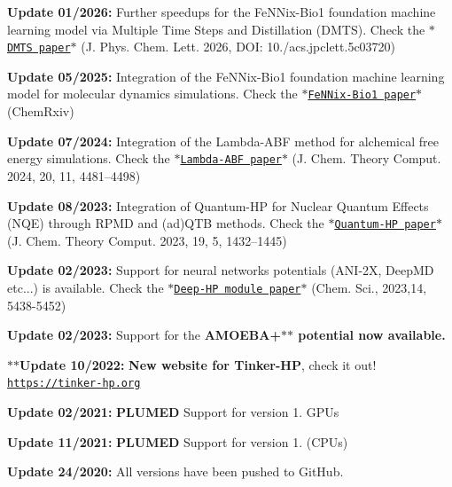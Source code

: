 
\begin{DoxyItemize}
\item {\bfseries Update 01/2026\-:} Further speedups for the Fe\-N\-Nix-\/\-Bio1 foundation machine learning model via Multiple Time Steps and Distillation (D\-M\-T\-S). Check the \href{https://pubs.acs.org/doi/full/10.1021/acs.jpclett.5c03720}{\tt $\ast$\-D\-M\-T\-S paper$\ast$} (J. Phys. Chem. Lett. 2026, D\-O\-I\-: 10./acs.jpclett.\-5c03720)
\item {\bfseries Update 05/2025\-:} Integration of the Fe\-N\-Nix-\/\-Bio1 foundation machine learning model for molecular dynamics simulations. Check the \href{https://doi.org/10.26434/chemrxiv-2025-f1hgn-v4}{\tt $\ast$\-Fe\-N\-Nix-\/\-Bio1 paper$\ast$} (Chem\-Rxiv)
\item {\bfseries Update 07/2024\-:} Integration of the Lambda-\/\-A\-B\-F method for alchemical free energy simulations. Check the \href{https://doi.org/10.1021/acs.jctc.3c01249}{\tt $\ast$\-Lambda-\/\-A\-B\-F paper$\ast$} (J. Chem. Theory Comput. 2024, 20, 11, 4481–4498)
\item {\bfseries Update 08/2023\-:} Integration of Quantum-\/\-H\-P for Nuclear Quantum Effects (N\-Q\-E) through R\-P\-M\-D and (ad)Q\-T\-B methods. Check the \href{https://doi.org/10.1021/acs.jctc.2c01233}{\tt $\ast$\-Quantum-\/\-H\-P paper$\ast$} (J. Chem. Theory Comput. 2023, 19, 5, 1432–1445)
\item {\bfseries Update 02/2023\-:} Support for neural networks potentials (A\-N\-I-\/2\-X, Deep\-M\-D etc...) is available. Check the \href{https://doi.org/10.1039/D2SC04815A}{\tt $\ast$\-Deep-\/\-H\-P module paper$\ast$} (Chem. Sci., 2023,14, 5438-\/5452)
\item {\bfseries Update 02/2023\-:} Support for the {\bfseries A\-M\-O\-E\-B\-A+$\ast$$\ast$ potential now available.}
\item {\bfseries $\ast$$\ast$\-Update 10/2022\-:} {\bfseries New website for Tinker-\/\-H\-P}, check it out! \href{https://tinker-hp.org}{\tt https\-://tinker-\/hp.\-org}
\item {\bfseries Update 02/2021\-:} {\bfseries P\-L\-U\-M\-E\-D} Support for version 1. G\-P\-Us
\item {\bfseries Update 11/2021\-:} {\bfseries P\-L\-U\-M\-E\-D} Support for version 1. (C\-P\-Us)
\item {\bfseries Update 24/2020\-:} All versions have been pushed to Git\-Hub. 


\end{DoxyItemize}


